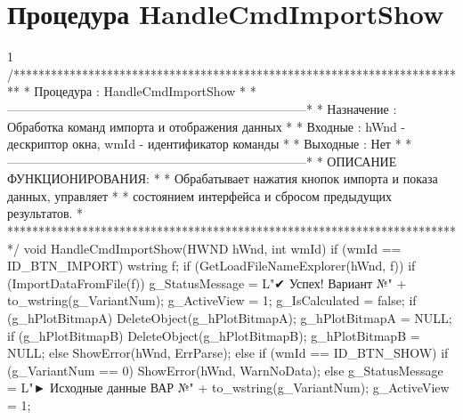 \section{Процедура HandleCmdImportShow}
\footnotesize
\begin{listing}{1}
/*************************************************************************
* Процедура     : HandleCmdImportShow                                    *
*------------------------------------------------------------------------*
* Назначение    : Обработка команд импорта и отображения данных          *
* Входные       : hWnd - дескриптор окна, wmId - идентификатор команды   *
* Выходные      : Нет                                                    *
*------------------------------------------------------------------------*
* ОПИСАНИЕ ФУНКЦИОНИРОВАНИЯ:                                             *
* Обрабатывает нажатия кнопок импорта и показа данных, управляет         *
* состоянием интерфейса и сбросом предыдущих результатов.                *
*************************************************************************/
void HandleCmdImportShow(HWND hWnd, int wmId) {
    if (wmId == ID_BTN_IMPORT) { wstring f;
        if (GetLoadFileNameExplorer(hWnd, f)) {
            if (ImportDataFromFile(f)) {
                g_StatusMessage = L"✔ Успех! Вариант №" + to_wstring(g_VariantNum);
                g_ActiveView = 1; g_IsCalculated = false;
                if (g_hPlotBitmapA) { DeleteObject(g_hPlotBitmapA); g_hPlotBitmapA = NULL;}
                if (g_hPlotBitmapB) { DeleteObject(g_hPlotBitmapB); 
		g_hPlotBitmapB = NULL; }
	} else ShowError(hWnd, ErrParse);}
}
    else if (wmId == ID_BTN_SHOW) { if (g_VariantNum == 0) ShowError(hWnd, WarnNoData);
        else { g_StatusMessage = L"► Исходные данные ВАР №" + to_wstring(g_VariantNum); 
            g_ActiveView = 1; }
    }
}
\end{listing}
\normalsize

\pagebreak


